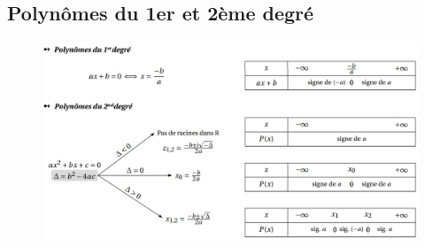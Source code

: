 \documentclass[12]{article}%
\theoremstyle{plain}
\theoremstyle{definition}
\theoremstyle{remark}
\begin{document}
\subsection{Polynômes du 1er et 2ème degré}
\begin{figure}[h] %
	\centering\texttt{}
	\includegraphics[width=1\textwidth]{./images/polynomes.png} %
	\label{fig:polynome} %
\end{figure}
\end{document}
